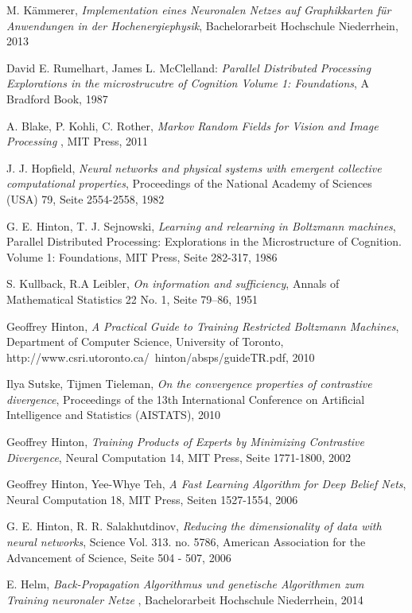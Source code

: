 \documentclass[12pt]{article}
\begin{document}
\newpage
\begin{thebibliography}{99}


M. Kämmerer, \emph{Implementation eines Neuronalen Netzes auf Graphikkarten für Anwendungen in der Hochenergiephysik}, Bachelorarbeit Hochschule Niederrhein, 2013

 David E. Rumelhart, James L. McClelland: {\em Parallel Distributed Processing Explorations in the microstrucutre of Cognition Volume 1: Foundations}, A Bradford Book, 1987

A. Blake, P. Kohli, C. Rother,
\emph{Markov Random Fields for Vision and Image Processing}
, MIT Press, 2011

J. J. Hopfield,
 \emph{Neural networks and physical systems with emergent collective computational properties},
Proceedings of the National Academy of Sciences (USA) 79, Seite 2554-2558,
1982


G. E. Hinton, T. J. Sejnowski,
\emph{Learning and relearning in Boltzmann machines}, 
Parallel Distributed Processing: Explorations in the Microstructure of Cognition. Volume 1: Foundations, MIT Press, Seite 282-317, 1986


 S. Kullback, R.A Leibler,
\emph{On information and sufficiency},
Annals of Mathematical Statistics 22 No. 1,
Seite  79–86,
 1951
 
 
Geoffrey Hinton,
\emph{A Practical Guide to Training Restricted Boltzmann Machines},
Department of Computer Science, 
University of Toronto, http://www.csri.utoronto.ca/~hinton/absps/guideTR.pdf,
2010

Ilya Sutske, Tijmen Tieleman,
\emph{On the convergence properties of contrastive divergence},
Proceedings of the 13th International Conference on Artificial Intelligence and Statistics (AISTATS),
2010 

Geoffrey Hinton,
\emph{Training Products of Experts by Minimizing Contrastive Divergence},
Neural Computation 14, MIT Press, Seite 1771-1800,
2002


Geoffrey Hinton, Yee-Whye Teh,
\emph{A Fast Learning Algorithm for Deep Belief Nets},
Neural Computation 18, MIT Press, Seiten 1527-1554,
2006

G. E. Hinton, R. R. Salakhutdinov,
\emph{Reducing the dimensionality of data with neural networks},
Science Vol. 313. no. 5786, American Association for the Advancement of Science, Seite 504 - 507,
2006

E. Helm, \emph{Back-Propagation Algorithmus und genetische
Algorithmen zum Training neuronaler Netze
}, Bachelorarbeit Hochschule Niederrhein, 2014



\end{thebibliography}
\newpage
\listoffigures
\listoftables
\end{document}
